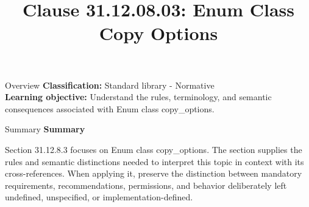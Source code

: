 \documentclass[10pt,letterpaper]{article}
\title{Clause 31.12.08.03: Enum Class Copy Options}
\author{}
\date{}
\begin{document}
\maketitle
\begin{CornellOverviewBox}{Overview}
\textbf{Classification:} Standard library - Normative\\[2pt]
\textbf{Learning objective:} Understand the rules, terminology, and semantic consequences associated with Enum class copy\_options.
\end{CornellOverviewBox}\begin{CornellSummaryBox}{Summary}
{\sffamily\bfseries\color{Accent} Summary}\par\vspace{3pt}Section 31.12.8.3 focuses on Enum class copy\_options. The section supplies the rules and semantic distinctions needed to interpret this topic in context with its cross-references. When applying it, preserve the distinction between mandatory requirements, recommendations, permissions, and behavior deliberately left undefined, unspecified, or implementation-defined.
\end{CornellSummaryBox}
\end{document}
